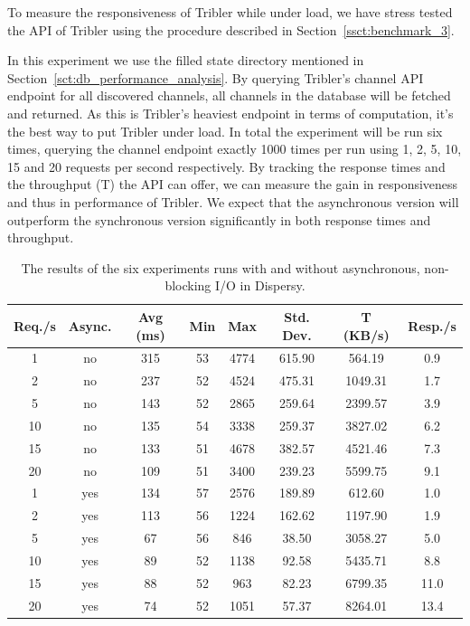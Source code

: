 To measure the responsiveness of Tribler while under load, we have stress tested the API of Tribler using the procedure described in Section~\ref{ssct:benchmark_3}.

In this experiment we use the filled state directory mentioned in Section~\ref{sct:db_performance_analysis}.
By querying Tribler's channel API endpoint for all discovered channels, all channels in the database will be fetched and returned.
As this is Tribler's heaviest endpoint in terms of computation, it's the best way to put Tribler under load.
In total the experiment will be run six times, querying the channel endpoint exactly 1000 times per run using 1, 2, 5, 10, 15 and 20 requests per second respectively.
By tracking the response times and the throughput (T) the API can offer, we can measure the gain in responsiveness and thus in performance of Tribler.
We expect that the asynchronous version will outperform the synchronous version significantly in both response times and throughput.

\begin{table}[!h]
	\centering
	\caption{The results of the six experiments runs with and without asynchronous, non-blocking I/O in Dispersy.}
	\label{table:responsiveness_tribler_load}
	\begin{tabular}{|c|c|c|c|c|c|c|c|}
		\hline
		Req./s & Async. & Avg (ms) & Min & Max  & Std. Dev. & T (KB/s) & Resp./s \\ \hline
		1      & no     & 315      & 53  & 4774 & 615.90    & 564.19   & 0.9     \\ \hline
		2      & no     & 237      & 52  & 4524 & 475.31    & 1049.31  & 1.7     \\ \hline
		5      & no     & 143      & 52  & 2865 & 259.64    & 2399.57  & 3.9     \\ \hline
		10     & no     & 135      & 54  & 3338 & 259.37    & 3827.02  & 6.2     \\ \hline
		15     & no     & 133      & 51  & 4678 & 382.57    & 4521.46  & 7.3     \\ \hline
		20     & no     & 109      & 51  & 3400 & 239.23    & 5599.75  & 9.1     \\ \hline
		1      & yes    & 134      & 57  & 2576 & 189.89    & 612.60   & 1.0     \\ \hline
		2      & yes    & 113      & 56  & 1224 & 162.62    & 1197.90  & 1.9     \\ \hline
		5      & yes    & 67       & 56  & 846  & 38.50     & 3058.27  & 5.0     \\ \hline
		10     & yes    & 89       & 52  & 1138 & 92.58     & 5435.71  & 8.8     \\ \hline
		15     & yes    & 88       & 52  & 963  & 82.23     & 6799.35  & 11.0    \\ \hline
		20     & yes    & 74       & 52  & 1051 & 57.37     & 8264.01  & 13.4    \\ \hline
	\end{tabular}
\end{table}

